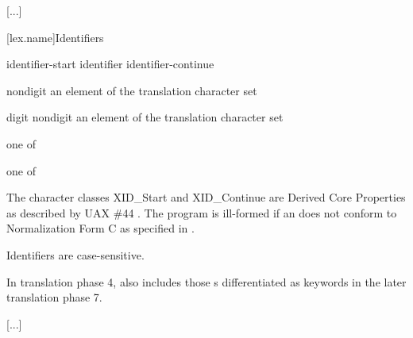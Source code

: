 \documentclass{wg21}
\begin{document}
\textcolor{noteclr}{[...]}

[lex.name]{Identifiers}

%
\begin{bnf}
    \br
    identifier-start\br
    identifier identifier-continue
\end{bnf}

\begin{bnf}
    \br
    nondigit\br
    \textnormal{an element of the translation character set }
\end{bnf}

\begin{bnf}
    \br
    digit\br
    nondigit\br
    \textnormal{an element of the translation character set }
\end{bnf}

\begin{bnf}
     \textnormal{one of}\br
    \br
    \br
    \br
\end{bnf}

\begin{bnf}
     \textnormal{one of}\br
\end{bnf}

\pnum
{}%
%
\added{[Note:}The character classes XID_Start and XID_Continue
are Derived Core Properties as described by UAX \#44 .\added{]}
The program is ill-formed
if an  does not conform to
Normalization Form C as specified in .
\begin{note}
    Identifiers are case-sensitive.
\end{note}
\begin{note}
    In translation phase 4,
     also includes
    those s
    differentiated as keywords
    in the later translation phase 7.
\end{note}

\textcolor{noteclr}{[...]}
\end{document}
